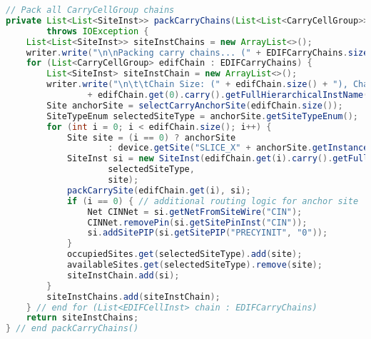 \newpage
\begin{lstlisting}[language=java, caption={Packing \texttt{CarryCellGroup}s into \texttt{SLICEL} \texttt{SiteInst}s.}, label={lst:carry_chains}]
// Pack all CarryCellGroup chains
private List<List<SiteInst>> packCarryChains(List<List<CarryCellGroup>> EDIFCarryChains)
        throws IOException {
    List<List<SiteInst>> siteInstChains = new ArrayList<>();
    writer.write("\n\nPacking carry chains... (" + EDIFCarryChains.size() + ")");
    for (List<CarryCellGroup> edifChain : EDIFCarryChains) {
        List<SiteInst> siteInstChain = new ArrayList<>();
        writer.write("\n\t\tChain Size: (" + edifChain.size() + "), Chain Anchor: "
                + edifChain.get(0).carry().getFullHierarchicalInstName());
        Site anchorSite = selectCarryAnchorSite(edifChain.size());
        SiteTypeEnum selectedSiteType = anchorSite.getSiteTypeEnum();
        for (int i = 0; i < edifChain.size(); i++) {
            Site site = (i == 0) ? anchorSite
                    : device.getSite("SLICE_X" + anchorSite.getInstanceX() + "Y" + (anchorSite.getInstanceY() + i));
            SiteInst si = new SiteInst(edifChain.get(i).carry().getFullHierarchicalInstName(), design,
                    selectedSiteType,
                    site);
            packCarrySite(edifChain.get(i), si);
            if (i == 0) { // additional routing logic for anchor site
                Net CINNet = si.getNetFromSiteWire("CIN");
                CINNet.removePin(si.getSitePinInst("CIN"));
                si.addSitePIP(si.getSitePIP("PRECYINIT", "0"));
            }
            occupiedSites.get(selectedSiteType).add(site);
            availableSites.get(selectedSiteType).remove(site);
            siteInstChain.add(si);
        }
        siteInstChains.add(siteInstChain);
    } // end for (List<EDIFCellInst> chain : EDIFCarryChains)
    return siteInstChains;
} // end packCarryChains()
\end{lstlisting}


